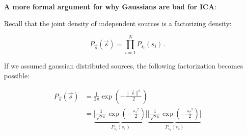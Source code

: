 \begin{frame}
\newpage
\textbf{A more formal argument for why Gaussians are bad for ICA}:

Recall that the joint density of independent sources is a factorizing density:

\begin{equation}
\label{eq:facts}
P_{\vec s}(\vec s) = \prod_{i=1}^{N} P_{s_i}(s_i)  \,.
\end{equation}

If we assumed gaussian distributed sources, the following factorization becomes possible:

\begin{equation}
	\label{eq:factsgauss}
	\begin{array}{ll}
	P_{\vec{s}}({\vec{s}}) 
	& = \frac{1}{2\pi} 
    \exp \left( -\frac{\lVert{\vec{s}}\rVert^2}{2} \right)
	\\
	& = \underbrace{
	\Bigg[ \frac{1}{\sqrt{2\pi}} \exp \left( -
		\frac{{s_1}^2}{2} \right) \Bigg]
		}_{{P}_{s_1}({s}_1)}
		\underbrace{\Bigg[
			\frac{1}{\sqrt{2\pi}} \exp \left( -
			\frac{{s_2}^2}{2} \right)
		\Bigg]
			}_{{P}_{s_2}({s}_2)}
	\end{array}
\end{equation}
\end{frame}

